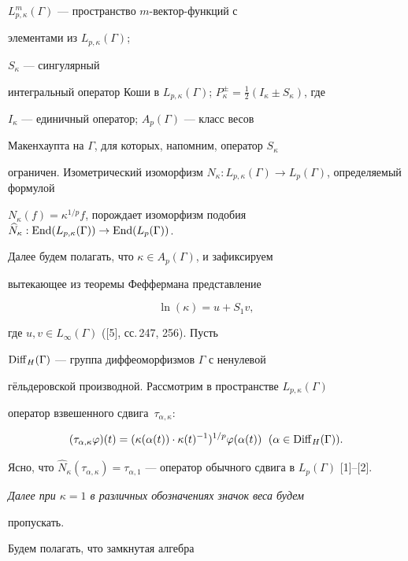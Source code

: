 $L_{p,\kappa}^m(\Gamma)$ --- пространство $m$-вектор-функций с


элементами из $L_{p,\kappa}(\Gamma)$;


$S_\kappa$ --- сингулярный


интегральный оператор Коши в $L_{p,\kappa}(\Gamma)$; $P^\pm_\kappa =


\frac{1}{2}(I_\kappa\pm S_\kappa)$, где


$I_\kappa$ --- единичный оператор; $A_p(\Gamma)$ --- класс весов


Макенхаупта на $\Gamma$, для которых, напомним, оператор $S_\kappa$


ограничен. Изометрический изоморфизм $N_\kappa :


L_{p,\kappa}(\Gamma)\to L_{p}(\Gamma)$, определяемый формулой


$N_\kappa (f)=\kappa^{1/p}f$, порождает изоморфизм подобия $


\widehat{N}_\kappa :\End(L_{p,\kappa}(\Gamma))\to \End


(L_p(\Gamma))$.


Далее будем полагать, что $\kappa\in A_p(\Gamma)$, и зафиксируем


вытекающее из теоремы Феффермана представление


\begin{equation}


\ln (\kappa)=u+S_1v,


\end{equation}


где $u,v\in L_\infty (\Gamma)$ ([5], сс.\,247, 256). Пусть


$\operatorname{Diff}_H(\Gamma)$ --- группа диффеоморфизмов $\Gamma$ с ненулевой


г\"ельдеровской производной. Рассмотрим в пространстве $L_{p,\kappa}(\Gamma)$


оператор взвешенного сдвига~$\tau_{\alpha,\kappa}$:


$$


(\tau_{\alpha,\kappa}\varphi)(t)=


(\kappa (\alpha (t))\cdot\kappa (t)^{-1})^{1/p}\varphi (\alpha (t))\ \;


(\alpha\in \Diff_H(\Gamma)).


$$


Ясно, что $\widehat{N}_\kappa (\tau_{\alpha,\kappa})=


\tau_{\alpha,1}$ --- оператор обычного сдвига в $L_p(\Gamma)$ [1]--[2].


{\it Далее при $\kappa =1$ в различных обозначениях значок веса будем


пропускать.} Будем полагать, что замкнутая алгебра


